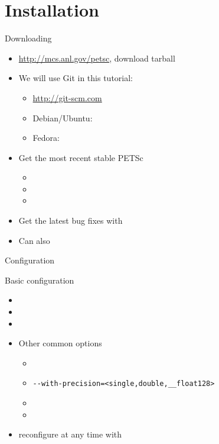 \section{Installation}
\begin{frame}{Downloading}
\begin{itemize}
  \item \url{http://mcs.anl.gov/petsc}, download tarball
  \item We will use Git in this tutorial:
  \begin{itemize}
    \item \url{http://git-scm.com}
    \item Debian/Ubuntu: 
    \item Fedora: 
  \end{itemize}
  \item Get the most recent stable PETSc
  \begin{itemize}\footnotesize
    \item {}
    \item {}
    \item {}
  \end{itemize}
  \item Get the latest bug fixes with 
  \item Can also 
\end{itemize}
\end{frame}

\begin{frame}[fragile]{Configuration}
\begin{block}{Basic configuration}
\begin{itemize}\footnotesize
  \item {}
  \item {}
  \item {}
\end{itemize}
\end{block}
\begin{itemize}
\item Other common options
  \begin{itemize}\footnotesize
  \item {}
  \item %
    \verb|--with-precision=<single,double,__float128>|
  \item {}
  \item {}
  \end{itemize}
\item reconfigure at any time with \\
  {\footnotesize {}}
\end{itemize}
\end{frame}

